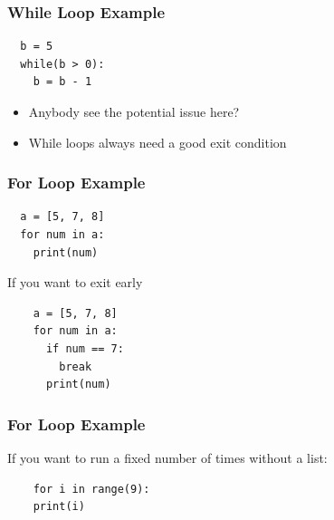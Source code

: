 \documentclass[aspectratio=169]{beamer}
\begin{document}
\begin{frame}[fragile]
  \frametitle{While Loop Example}
  \begin{verbatim}
  b = 5
  while(b > 0):
    b = b - 1
  \end{verbatim}
  \pause
  \begin{itemize}
    \item Anybody see the potential issue here?
    \pause
    \item While loops always need a good exit condition
  \end{itemize}
\end{frame}
\begin{frame}[fragile]
  \frametitle{For Loop Example}

  \begin{verbatim}
  a = [5, 7, 8]
  for num in a:
    print(num)
  \end{verbatim}
  \pause
  If you want to exit early
  \begin{verbatim}
    a = [5, 7, 8]
    for num in a:
      if num == 7:
        break
      print(num)
  \end{verbatim}
\end{frame}
\begin{frame}[fragile]
  \frametitle{For Loop Example}

  If you want to run a fixed number of times without a list:
  \begin{verbatim}
    for i in range(9):
    print(i)
  \end{verbatim}

\end{frame}
\end{document}
